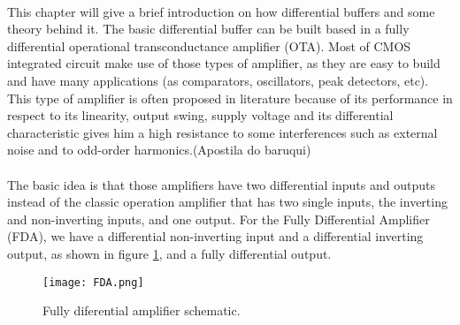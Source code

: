 \paragraph{}This chapter will give a brief introduction on how differential buffers and some theory behind it. The basic differential buffer can be built based in a fully differential operational transconductance amplifier (OTA). Most of CMOS integrated circuit make use of those types of amplifier, as they are easy to build and have many applications (as comparators, oscillators, peak detectors, etc). This type of amplifier is often proposed in literature because of its performance in respect to its linearity, output swing, supply voltage and its differential characteristic gives him a high resistance to some interferences such as external noise and to odd-order harmonics.(Apostila do baruqui)

\paragraph{}The basic idea is that those amplifiers have two differential inputs and outputs instead of the classic operation amplifier that has two single inputs, the inverting and non-inverting inputs, and one output. For the Fully Differential Amplifier (FDA), we have a differential non-inverting input and a differential inverting output, as shown in figure \ref{FDA}, and a fully differential output.

\begin{figure}
	\begin{center}
		\parbox[htb]{13.0cm}
		{
			\begin{center}
				\texttt{[image: FDA.png]}
				\caption[\small{Fully diferential amplifier schematic.}]{\label{FDA} \small{Fully diferential amplifier schematic.}}
			\end{center}
		}
	\end{center}
\end{figure}

